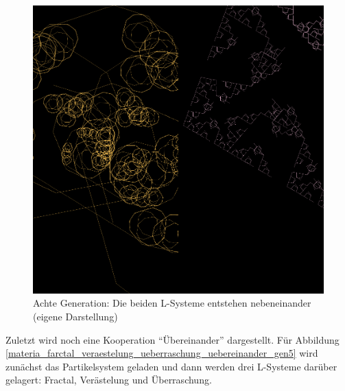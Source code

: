 \documentclass[../mciAusarbeitung.tex]{subfiles}
\begin{document}
\begin{figure}[H]
\includegraphics[width=\linewidth]{img/sierpinski_veraestelung_gen8_nebeneinander2x1.png}
\caption{Achte Generation: Die beiden L-Systeme entstehen nebeneinander (eigene Darstellung)}
\label{sierpinski_veraestelung_gen8_nebeneinander2x1}
\end{figure}

Zuletzt wird noch eine Kooperation "`Übereinander"' dargestellt. Für Abbildung \ref{materia_farctal_veraestelung_ueberraschung_uebereinander_gen5} wird zunächst das Partikelsystem geladen und dann werden drei L-Systeme darüber gelagert: Fractal, Verästelung und Überraschung.
\end{document}
